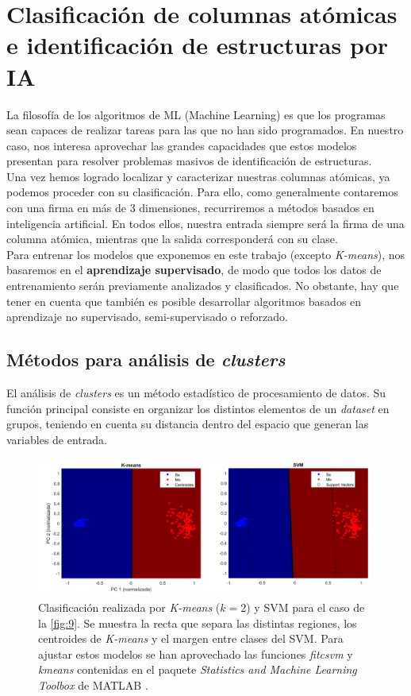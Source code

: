 \section{Clasificación de columnas atómicas e identificación de estructuras por IA}

La filosofía de los algoritmos de ML (Machine Learning) es que los programas sean capaces de realizar tareas para las que no han sido programados. En nuestro caso, nos interesa aprovechar las grandes capacidades que estos modelos presentan para resolver problemas masivos de identificación de estructuras.\\

Una vez hemos logrado localizar y caracterizar nuestras columnas atómicas, ya podemos proceder con su clasificación. Para ello, como generalmente contaremos con una firma en más de 3 dimensiones, recurriremos a métodos basados en inteligencia artificial. En todos ellos, nuestra entrada siempre será la firma de una columna atómica, mientras que la salida corresponderá con su clase.\\

Para entrenar los modelos que exponemos en este trabajo (excepto \textit{K-means}), nos basaremos en el \textbf{aprendizaje supervisado}, de modo que todos los datos de entrenamiento serán previamente analizados y clasificados. No obstante, hay que tener en cuenta que también es posible desarrollar algoritmos basados en aprendizaje no supervisado, semi-supervisado o reforzado.\\

\subsection{Métodos para análisis de \textit{clusters}}
El análisis de \textit{clusters} es un método estadístico de procesamiento de datos. Su función principal consiste en organizar los distintos elementos de un \textit{dataset} en grupos, teniendo en cuenta su distancia dentro del espacio que generan las variables de entrada.\\

\begin{figure}[h!]
    \centering
    \includegraphics[width=1\textwidth]{fig/Fig12.png}
    \caption{Clasificación realizada por \textit{K-means} ($k=2$) y SVM para el caso de la \autoref{fig:9}. Se muestra la recta que separa las distintas regiones, los centroides de \textit{K-means} y el margen entre clases del SVM. Para ajustar estos modelos se han aprovechado las funciones \textit{fitcsvm} y \textit{kmeans} contenidas en el paquete \textit{Statistics and Machine Learning Toolbox} de MATLAB \cite{repo}.}
    \label{fig:12}
\end{figure}

